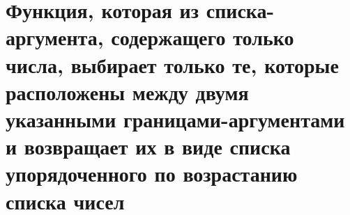 


\section{Функция, которая из списка-аргумента, содержащего только числа, выбирает только те, которые расположены между двумя указанными гра\-ни\-ца\-ми-аргументами и возвращает их в виде списка упорядоченного по возрастанию списка чисел}

